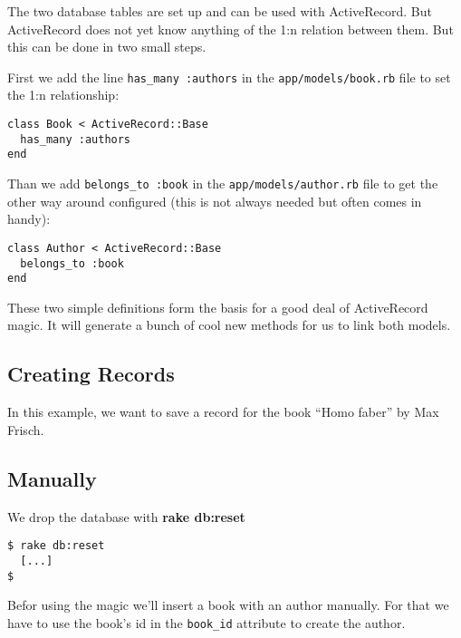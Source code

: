 \documentclass[a4paper]{book}
\newcounter{tab}[chapter]
\begin{document}
The two database tables are set up and can be used with ActiveRecord. But ActiveRecord does not yet know anything of the 1:n relation between them. But this can be done in two small steps.

First we add the line \texttt{has\_many :authors} in the \texttt{app/models/book.rb} file to set the 1:n relationship:

\begin{shaded}\begin{verbatim}
class Book < ActiveRecord::Base
  has_many :authors
end
\end{verbatim}\end{shaded}

Than we add \texttt{belongs\_to :book} in the \texttt{app/models/author.rb} file to get the other way around configured (this is not always needed but often comes in handy):

\begin{shaded}\begin{verbatim}
class Author < ActiveRecord::Base
  belongs_to :book
end
\end{verbatim}\end{shaded}

These two simple definitions form the basis for a good deal of ActiveRecord magic. It will generate a bunch of cool new methods for us to link both models.

\subsection{Creating Records}\label{creating-records}

In this example, we want to save a record for the book “Homo faber” by Max Frisch.

\subsection{Manually}\label{manually}

We drop the database with \textbf{rake db:reset}

\begin{shaded}\begin{verbatim}
$ rake db:reset
  [...]
$  
\end{verbatim}\end{shaded}

Befor using the magic we'll insert a book with an author manually. For that we have to use the book's id in the \texttt{book\_id} attribute to create the author.
\end{document}
